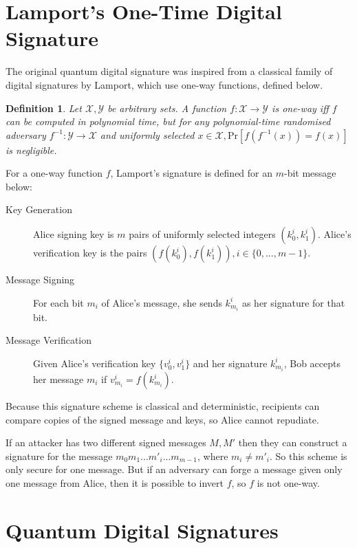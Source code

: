 \documentclass[%
 reprint,
 amsmath,amssymb,
 aps,
 pra,
]{revtex4-1}
\newtheorem{definition}{Definition}[section]
\begin{document}
\section{Lamport's One-Time Digital Signature}
\label{sec:lamport}

The original quantum digital signature was inspired from a classical family of digital signatures by Lamport\cite{lamp79}, which use one-way functions, defined below.

\begin{definition}
Let $\mathcal{X}, \mathcal{Y}$ be arbitrary sets. A function $f:\mathcal{X} \rightarrow \mathcal{Y}$ is one-way iff $f$ can be computed in polynomial time, but for any polynomial-time randomised adversary $f^{-1}:\mathcal{Y} \rightarrow \mathcal{X}$ and uniformly selected $x \in \mathcal{X}, \mathrm{Pr}[f(f^{-1}(x)) = f(x)]$ is negligible.
\end{definition}

For a one-way function $f$, Lamport's signature is defined for an $m$-bit message below:

\begin{description}
\item[Key Generation]Alice signing key is $m$ pairs of uniformly selected integers $(k^i_0, k^i_1)$. Alice's verification key is the pairs $(f(k^i_0), f(k^i_1)), i \in \{0,...,m-1\}$.
\item[Message Signing]For each bit $m_i$ of Alice's message, she sends $k^i_{m_i}$ as her signature for that bit.
\item[Message Verification]Given Alice's verification key $\{v^i_0, v^i_1\}$ and her signature $k^i_{m_i}$, Bob accepts her message $m_i$ if $v^i_{m_i} = f(k^i_{m_i})$.
\end{description}

Because this signature scheme is classical and deterministic, recipients can compare copies of the signed message and keys, so Alice cannot repudiate.

If an attacker has two different signed messages $M, M'$ then they can construct a signature for the message $m_0m_1...m'_i...m_{m-1}$, where $m_i \neq m'_i$. So this scheme is only secure for one message. But if an adversary can forge a message given only one message from Alice, then it is possible to invert $f$, so $f$ is not one-way.

\section{Quantum Digital Signatures}
\label{sec:qds}
\end{document}
